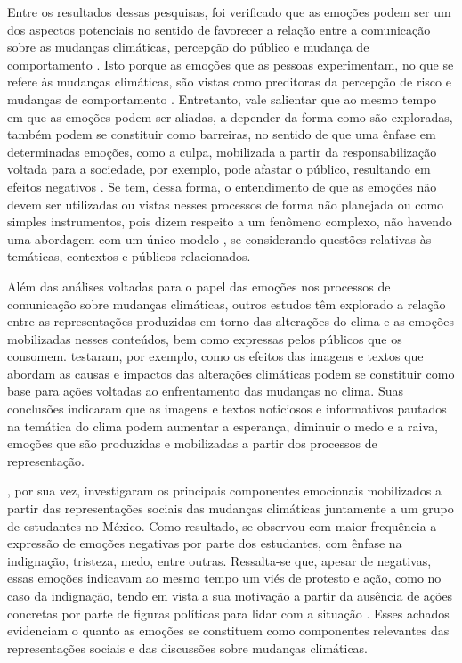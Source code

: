 \documentclass[portuguese]{textolivre}
\begin{document}
Entre os resultados dessas pesquisas, foi verificado que as emoções podem ser um dos aspectos potenciais no sentido de favorecer a relação entre a comunicação sobre as mudanças climáticas, percepção do público e mudança de comportamento \cite{salama2018role,chapman2017reassessing}. Isto porque as emoções que as pessoas experimentam, no que se refere às mudanças climáticas, são vistas como preditoras da percepção de risco e mudanças de comportamento \cite{brosch2021affect}. Entretanto, vale salientar que ao mesmo tempo em que as emoções podem ser aliadas, a depender da forma como são exploradas, também podem se constituir como barreiras, no sentido de que uma ênfase em determinadas emoções, como a culpa, mobilizada a partir da responsabilização voltada para a sociedade, por exemplo, pode afastar o público, resultando em efeitos negativos \cite{harth2021affect}. Se tem, dessa forma, o entendimento de que as emoções não devem ser utilizadas ou vistas nesses processos de forma não planejada ou como simples instrumentos, pois dizem respeito a um fenômeno complexo, não havendo uma abordagem com um único modelo \cite{chapman2017reassessing}, se considerando questões relativas às temáticas, contextos e públicos relacionados.

Além das análises voltadas para o papel das emoções nos processos de comunicação sobre mudanças climáticas, outros estudos têm explorado a relação entre as representações produzidas em torno das alterações do clima e as emoções mobilizadas nesses conteúdos, bem como expressas pelos públicos que os consomem. \textcite{feldman2017hope} testaram, por exemplo, como os efeitos das imagens e textos que abordam as causas e impactos das alterações climáticas podem se constituir como base para ações voltadas ao enfrentamento das mudanças no clima. Suas conclusões indicaram que as imagens e textos noticiosos e informativos pautados na temática do clima podem aumentar a esperança, diminuir o medo e a raiva, emoções que são produzidas e mobilizadas a partir dos processos de representação.

\textcite{flores2018emociones}, por sua vez, investigaram os principais componentes emocionais mobilizados a partir das representações sociais das mudanças climáticas juntamente a um grupo de estudantes no México. Como resultado, se observou com maior frequência a expressão de emoções negativas por parte dos estudantes, com ênfase na indignação, tristeza, medo, entre outras. Ressalta-se que, apesar de negativas, essas emoções indicavam ao mesmo tempo um viés de protesto e ação, como no caso da indignação, tendo em vista a sua motivação a partir da ausência de ações concretas por parte de figuras políticas para lidar com a situação \cite{flores2018emociones}. Esses achados evidenciam o quanto as emoções se constituem como componentes relevantes das representações sociais e das discussões sobre mudanças climáticas.
\end{document}
